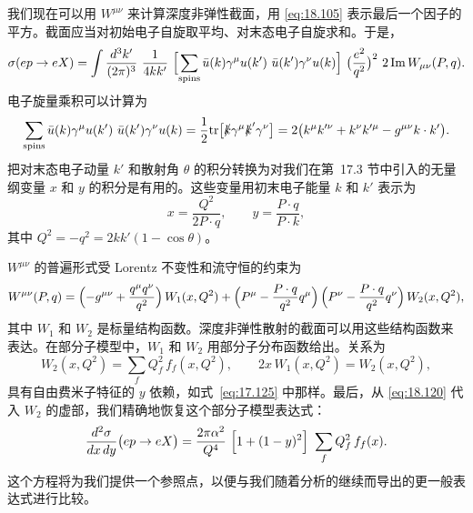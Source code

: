 我们现在可以用 $W^{\mu\nu}$ 来计算深度非弹性截面，用 \eqref{eq:18.105} 表示最后一个因子的平方。截面应当对初始电子自旋取平均、对末态电子自旋求和。于是，
\begin{equation}
  \sigma(ep \to eX) = \int \frac{d^3k'}{(2\pi)^3}\ \frac{1}{4kk'}\ \Bigl[
    \sum_{\text{spins}} \bar{u}(k)\gamma^\mu u(k')\ \bar{u}(k')\gamma^\nu
    u(k) \Bigr]\ \bigl( \frac{e^2}{q^2} \bigr)^2\ 2\,\mathrm{Im}\,W_{\mu\nu}
    (P, q) .
  \label{eq:18.106}
\end{equation}
电子旋量乘积可以计算为
\begin{equation}
  \sum_{\text{spins}} \bar{u}(k)\gamma^\mu u(k')\ \bar{u}(k')\gamma^\nu
    u(k) = \frac{1}{2}\mathrm{tr}\bigl[ \slashed{k}\gamma^\mu
    \slashed{k}'\gamma^\nu \bigr]
  = 2\bigl( k^\mu k'^{\nu} + k^\nu k'^{\mu} - g^{\mu\nu}k\cdot k'
    \bigr) .
  \label{eq:18.107}
\end{equation}
把对末态电子动量 $k'$ 和散射角 $\theta$ 的积分转换为对我们在第~17.3 节中引入的无量纲变量 $x$ 和 $y$ 的积分是有用的。这些变量用初末电子能量 $k$ 和 $k'$ 表示为
\begin{equation}
  x = \frac{Q^2}{2P\cdot q},\qquad
  y = \frac{P\cdot q}{P\cdot k} ,
  \label{eq:18.108}
\end{equation}
其中 $Q^2 = -q^2 = 2kk'(1-\cos\theta)$。

$W^{\mu\nu}$ 的普遍形式受 Lorentz 不变性和流守恒的约束为
\begin{equation}
  W^{\mu\nu}(P, q) = \Bigl( -g^{\mu\nu} + \frac{q^\mu q^\nu}{q^2} \Bigr)\,
    W_1(x, Q^2) + \Bigl( P^\mu - \frac{P\cdot q}{q^2}q^\mu \Bigr)\,
    \Bigl( P^\nu - \frac{P\cdot q}{q^2}q^\nu \Bigr)\,
    W_2(x, Q^2) ,
  \label{eq:18.113}
\end{equation}
其中 $W_1$ 和 $W_2$ 是标量结构函数。深度非弹性散射的截面可以用这些结构函数来表达。在部分子模型中，$W_1$ 和 $W_2$ 用部分子分布函数给出。关系为
\begin{equation}
  W_2(x, Q^2) = \sum_f Q_f^2\,f_f(x, Q^2),\qquad
  2x\,W_1(x, Q^2) = W_2(x, Q^2) ,
  \label{eq:18.120}
\end{equation}
具有自由费米子特征的 $y$ 依赖，如式~\eqref{eq:17.125} 中那样。最后，从 \eqref{eq:18.120} 代入 $W_2$ 的虚部，我们精确地恢复这个部分子模型表达式：
\begin{equation}
  \frac{d^2\sigma}{dx\,dy}\bigl( ep \to eX \bigr)
  = \frac{2\pi\alpha^2}{Q^4}\ \Bigl[ 1 + (1-y)^2 \Bigr]\
    \sum_f Q_f^2\,f_f(x) .
  \label{eq:18.123}
\end{equation}
这个方程将为我们提供一个参照点，以便与我们随着分析的继续而导出的更一般表达式进行比较。

